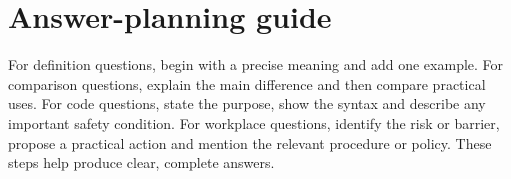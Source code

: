 \documentclass[11pt,openany,oneside]{book}
\begin{document}
\section{Answer-planning guide}
For definition questions, begin with a precise meaning and add one example. For comparison questions, explain the main difference and then compare practical uses. For code questions, state the purpose, show the syntax and describe any important safety condition. For workplace questions, identify the risk or barrier, propose a practical action and mention the relevant procedure or policy. These steps help produce clear, complete answers.
\end{document}

